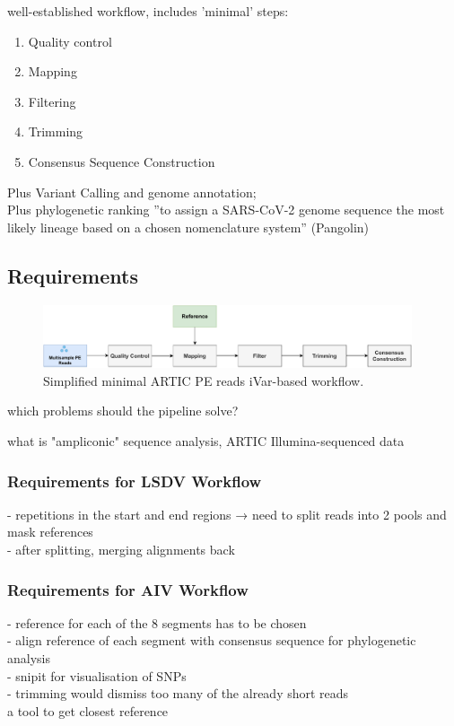 well-established workflow, includes 'minimal' steps:
\begin{enumerate}
	\item Quality control
	\item Mapping
	\item Filtering
	\item Trimming
	\item Consensus Sequence Construction
\end{enumerate}

Plus Variant Calling and genome annotation; \\
Plus phylogenetic ranking ''to assign a SARS-CoV-2 genome sequence the most likely lineage based on a chosen nomenclature system'' (Pangolin)

\subsection{Requirements}

\begin{figure}
	\centering
	\includegraphics[width=0.97\textwidth]{media/workflow-diagrams/pipelines-minimal.pdf}
	\caption{Simplified minimal ARTIC PE reads iVar-based workflow.}
	\label{fig:wf-minimal}
\end{figure}

which problems should the pipeline solve?

what is "ampliconic" sequence analysis, ARTIC Illumina-sequenced data

\subsubsection{Requirements for LSDV Workflow}
- repetitions in the start and end regions → need to split reads into 2 pools and mask references \\
- after splitting, merging alignments back

\subsubsection{Requirements for AIV Workflow}
- reference for each of the 8 segments has to be chosen \\
- align reference of each segment with consensus sequence for phylogenetic analysis \\
- snipit for visualisation of SNPs \\
- trimming would dismiss too many of the already short reads
\\ a tool to get closest reference

